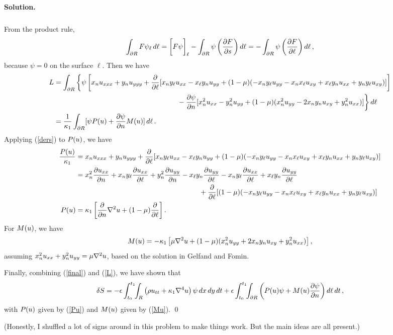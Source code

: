 \documentclass[11pt]{article}
\newcommand{\refeq}[1]{(\ref{#1})}
\newcommand{\beq}{\begin{equation*}}
\newcommand{\eeq}{\end{equation*}}
\newcommand{\beqn}{\begin{equation}}
\newcommand{\eeqn}{\end{equation}}
\newenvironment{solution}
{
    \paragraph{Solution.}
    \ignorespaces
}
{
}
\begin{document}
\begin{solution}
\begin{align*}
	\end{align*}
	From the product rule,
	\beq
		\intdr F \psil \dd{\ell} = \bigg[ F \psi \bigg]_\ell - \intdr \psi \left( \pdv{F}{s} \right) \dd{\ell} = -\intdr \psi \left( \pdv{F}{\ell} \right) \dd{\ell},
	\eeq
	because $\psi = 0$ on the surface $\ell$.  Then we have
	\begin{align}
		L &= \int_{\partial R} \bigg\{ \psi \left[x_n u_{xxx} + y_n u_{yyy} + \pdv{}{\ell} [x_n y_\ell u_{xx} - x_\ell y_n u_{yy} + (1 - \mu) (-x_n y_\ell u_{yy} - x_n x_\ell u_{xy} + x_\ell y_n u_{xx} + y_n y_\ell u_{xy})] \right] \notag \\
		&\phantom{mmmmmmmmmmmmmmmmmmmm} - \pdv{\psi}{n} [x_n^2 u_{xx} - y_n^2 u_{yy} + (1 - \mu) (x_n^2 u_{yy} - 2 x_n y_n u_{xy} + y_n^2 u_{xx})] \bigg\} \dd{\ell} \notag \\
		&= \frac{1}{\kappa_1} \int_{\partial R} [ \psi P(u) + \pdv{\psi}{n} M(u) ] \dd{\ell}. \label{L}
	\end{align}
	Applying \refeq{ders} to $P(u)$, we have
	\begin{align}
		\frac{P(u)}{\kappa_1} &= x_n u_{xxx} + y_n u_{yyy} + \pdv{}{\ell} [x_n y_\ell u_{xx} - x_\ell y_n u_{yy} + (1 - \mu) (-x_n y_\ell u_{yy} - x_n x_\ell u_{xy} + x_\ell y_n u_{xx} + y_n y_\ell u_{xy})] \notag \\
		&= x_n^2 \pdv{u_{xx}}{n} + x_n y_\ell \pdv{u_{xx}}{\ell} + y_n^2 \pdv{u_{yy}}{n} - x_\ell y_n \pdv{u_{yy}}{\ell} - x_n y_\ell \pdv{u_{xx}}{\ell} + x_\ell y_n \pdv{u_{yy}}{\ell} \notag \\
		&\phantom{mmmmmmmmmmmmmmmmmmmm} + \pdv{}{\ell} [(1 - \mu) (-x_n y_\ell u_{yy} - x_n x_\ell u_{xy} + x_\ell y_n u_{xx} + y_n y_\ell u_{xy})] \notag \\
		P(u) &= \kappa_1 \left[ \pdv{}{n} \nabla^2 u + (1 - \mu) \pdv{}{\ell} (x_n y_n u_{xx} + (x_n y_n u_{yy} + x_\ell y_n) u_{xy} + y_n y_\ell u_{xy}) \right]. \label{Pu}
	\end{align}
	For $M(u)$, we have
	\beqn \label{Mu}
		\Mu = -\kaq \left[ \mu \lap u + (1 - \mu) (\xn^2 \uyy + 2 \xn \yn \uxy + \yn^2 \uxx) \right],
	\eeqn
	assuming $x_n^2 u_{xx} + y_n^2 u_{yy} = \mu \nabla^2 u$, based on the solution in Gelfand and Fomin.
	
	Finally, combining \refeq{final} and \refeq{L}, we have shown that
	\beqn
		\dS = -\eps \inttr \left(\rho \utt + \kaq \lapw u \right) \psi \drt + \eps \inttdr \left( \Pu \psi + \Mu \pdv{\psi}{n} \right) \dlt,
	\eeqn
	with $P(u)$ given by \refeq{Pu} and $M(u)$ given by \refeq{Mu}. \qed
	
	(Honestly, I shuffled a lot of signs around in this problem to make things work.  But the main ideas are all present.)
\end{solution}
\end{document}
